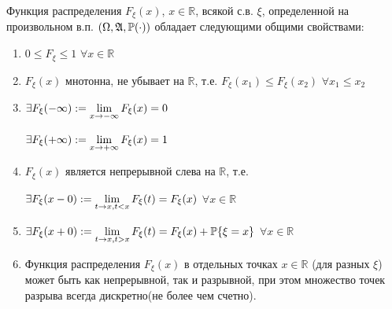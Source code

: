 \begin{proofs}
	Функция распределения $F_{\xi}(x)$, $x \in \mathbb{R}$, всякой с.в. $\xi$, определенной на произвольном в.п.
	$(\Omega, \mathfrak{A}, \mathbb{P}(\cdot))$ обладает следующими общими свойствами:
	\begin{enumerate}
	\item $0 \leq F_{\xi} \leq 1$ $\forall x \in \mathbb{R}$
	\item $F_{\xi}(x)$ мнотонна, не убывает на $\mathbb{R}$, т.е. $F_{\xi}(x_1) \leq F_{\xi}(x_2)$ $\forall x_1 \leq x_2$
	\item 
		$\exists F_{\xi}(-\infty) := \lim\limits_{x \to -\infty}F_{\xi}(x) = 0$
	
		$\exists F_{\xi}(+\infty) := \lim\limits_{x \to +\infty}F_{\xi}(x) = 1$
	\item $F_{\xi}(x)$ является непрерывной слева на $\mathbb{R}$, т.е. 
	
		$\exists F_{\xi}(x-0) := \lim\limits_{t \to x, t < x}F_{\xi}(t) = F_{\xi}(x)$ $\forall x \in \mathbb{R}$
	\item
		$\exists F_{\xi}(x+0) := \lim\limits_{t \to x, t > x}F_{\xi}(t) = F_{\xi}(x) + \mathbb{P}\{\xi = x\}$ $\forall x \in \mathbb{R}$
		
	\item Функция распределения $F_{\xi}(x)$ в отдельных точках $x \in \mathbb{R}$ (для разных $\xi$) может быть как непрерывной, так и разрывной, при этом
	множество точек разрыва всегда дискретно(не более чем счетно).		
	\end{enumerate}
\end{proofs}


